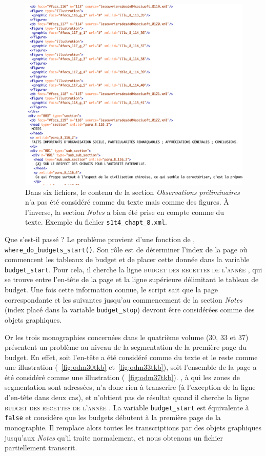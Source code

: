 \begin{figure}[ht]
    \centering
    \includegraphics[width=16cm]{img/deficit_transcrip.png}
    \caption[Exemple d'un déficit de transcription]{Dans six fichiers, le contenu de la section \textit{Observations préliminaires} n'a pas été considéré comme du texte mais comme des figures. À l'inverse, la section \textit{Notes} a bien été prise en compte comme du texte. Exemple du fichier \texttt{s1t4\_chapt\_8.xml}.}
    \label{fig:deficit}
\end{figure}

Que s'est-il passé ? Le problème provient d'une fonction de \lse, \texttt{where\_do\_\-budgets\_start()}. Son  rôle est de déterminer l'index de la page où commencent les tableaux de budget et de placer cette donnée dans la variable \texttt{budget\_start}. Pour cela, il cherche la ligne \og \textsc{budget des recettes de l'année} \fg, qui se trouve entre l'en-tête de la page et la ligne supérieure délimitant le tableau de budget. Une fois cette information connue, le script sait que la page correspondante et les suivantes jusqu'au commencement de la section \textit{Notes} (index placé dans la variable \texttt{budget\_stop}) devront être considérées comme des objets graphiques.

Or les trois monographies concernées dans le quatrième volume (\nos{}30, 33 et 37) présentent un problème au niveau de la segmentation de la première page du budget. En effet, soit l'en-tête a été considéré comme du texte et le reste comme une illustration (\fig{}~\ref{fig:odm30tkb} et~\ref{fig:odm33tkb}), soit l'ensemble de la page a été considéré comme une illustration (\fig{}~\ref{fig:odm37tkb}). \kraken, à qui les zones de segmentation sont adressées, n'a donc rien à transcrire (à l'exception de la ligne d'en-tête dans deux cas), et \lse{} n'obtient pas de résultat quand il cherche la ligne \og \textsc{budget des recettes de l'année} \fg{}. La variable \texttt{budget\_start} est équivalente à \texttt{false} et \lse{} considère que les budgets débutent à la première page de la monographie. Il remplace alors toutes les transcriptions par des objets graphiques jusqu'aux \textit{Notes} qu'il traite normalement, et nous obtenons un fichier partiellement transcrit.

